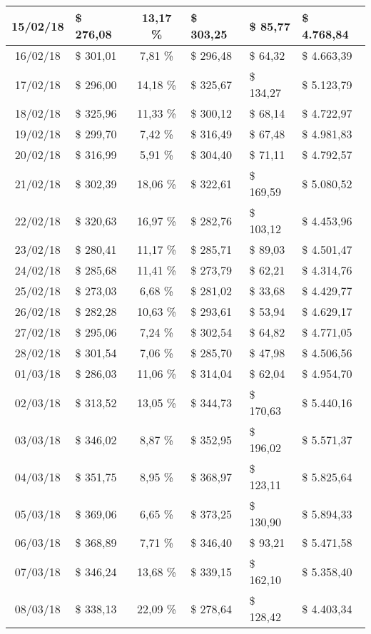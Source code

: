 \begin{center}
\begin{small}
\begin{longtable}{|c|l|c|l|l|l|}
15/02/18 & \$ 276,08 & 13,17 \% & \$ 303,25 & \$ 85,77 & \$ 4.768,84 \\ \hline
16/02/18 & \$ 301,01 & 7,81 \% & \$ 296,48 & \$ 64,32 & \$ 4.663,39 \\ \hline
17/02/18 & \$ 296,00 & 14,18 \% & \$ 325,67 & \$ 134,27 & \$ 5.123,79 \\ \hline
18/02/18 & \$ 325,96 & 11,33 \% & \$ 300,12 & \$ 68,14 & \$ 4.722,97 \\ \hline
19/02/18 & \$ 299,70 & 7,42 \% & \$ 316,49 & \$ 67,48 & \$ 4.981,83 \\ \hline
20/02/18 & \$ 316,99 & 5,91 \% & \$ 304,40 & \$ 71,11 & \$ 4.792,57 \\ \hline
21/02/18 & \$ 302,39 & 18,06 \% & \$ 322,61 & \$ 169,59 & \$ 5.080,52 \\ \hline
22/02/18 & \$ 320,63 & 16,97 \% & \$ 282,76 & \$ 103,12 & \$ 4.453,96 \\ \hline
23/02/18 & \$ 280,41 & 11,17 \% & \$ 285,71 & \$ 89,03 & \$ 4.501,47 \\ \hline
24/02/18 & \$ 285,68 & 11,41 \% & \$ 273,79 & \$ 62,21 & \$ 4.314,76 \\ \hline
25/02/18 & \$ 273,03 & 6,68 \% & \$ 281,02 & \$ 33,68 & \$ 4.429,77 \\ \hline
26/02/18 & \$ 282,28 & 10,63 \% & \$ 293,61 & \$ 53,94 & \$ 4.629,17 \\ \hline
27/02/18 & \$ 295,06 & 7,24 \% & \$ 302,54 & \$ 64,82 & \$ 4.771,05 \\ \hline
28/02/18 & \$ 301,54 & 7,06 \% & \$ 285,70 & \$ 47,98 & \$ 4.506,56 \\ \hline
01/03/18 & \$ 286,03 & 11,06 \% & \$ 314,04 & \$ 62,04 & \$ 4.954,70 \\ \hline
02/03/18 & \$ 313,52 & 13,05 \% & \$ 344,73 & \$ 170,63 & \$ 5.440,16 \\ \hline
03/03/18 & \$ 346,02 & 8,87 \% & \$ 352,95 & \$ 196,02 & \$ 5.571,37 \\ \hline
04/03/18 & \$ 351,75 & 8,95 \% & \$ 368,97 & \$ 123,11 & \$ 5.825,64 \\ \hline
05/03/18 & \$ 369,06 & 6,65 \% & \$ 373,25 & \$ 130,90 & \$ 5.894,33 \\ \hline
06/03/18 & \$ 368,89 & 7,71 \% & \$ 346,40 & \$ 93,21 & \$ 5.471,58 \\ \hline
07/03/18 & \$ 346,24 & 13,68 \% & \$ 339,15 & \$ 162,10 & \$ 5.358,40 \\ \hline
08/03/18 & \$ 338,13 & 22,09 \% & \$ 278,64 & \$ 128,42 & \$ 4.403,34 \\ \hline

\end{longtable}
\end{small}
\end{center}
